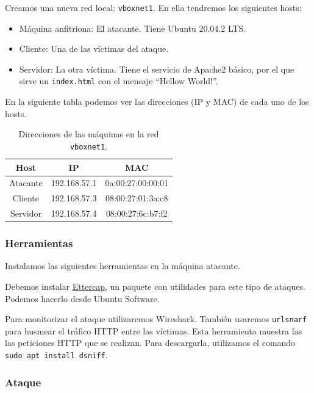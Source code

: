 \documentclass[11pt]{article}
\begin{document}
Creamos una nueva red local: \texttt{vboxnet1}. En ella tendremos los siguientes hosts:
\begin{itemize}
	\item Máquina anfitriona: El atacante. Tiene Ubuntu 20.04.2 LTS.
	\item Cliente: Una de las víctimas del ataque.
	\item Servidor: La otra víctima. Tiene el servicio de Apache2 básico, por el que sirve un \texttt{index.html} con el mensaje
	``Hellow World!''.
\end{itemize}

En la siguiente tabla podemos ver las direcciones (IP y MAC) de cada uno de los hosts.

\begin{table}[H]
	\centering
	\begin{tabular}{|c|c|c|}
		\hline
		\textbf{Host} & \textbf{IP}  & \textbf{MAC}      \\ \hline
		Atacante      & 192.168.57.1 & 0a:00:27:00:00:01 \\ \hline
		Cliente       & 192.168.57.3 & 08:00:27:01:3a:c8 \\ \hline
		Servidor      & 192.168.57.4 & 08:00:27:6c:b7:f2 \\ \hline
	\end{tabular}
	\caption{Direcciones de las máquinas en la red \texttt{vboxnet1}.}
	\label{tab:info-hosts}
\end{table}

\subsubsection*{Herramientas}

Instalamos las siguientes herramientas en la máquina atacante.

Debemos instalar \href{https://www.ettercap-project.org}{Ettercap}, un paquete con utilidades para este tipo de ataques.
Podemos hacerlo desde Ubuntu Software.

Para monitorizar el ataque utilizaremos Wireshark. También usaremos \texttt{urlsnarf} para husmear el tráfico HTTP entre las víctimas. Esta
herramienta muestra las las peticiones HTTP que se realizan. Para descargarla, utilizamos el comando \verb^sudo apt install dsniff^.

\subsubsection*{Ataque}
\end{document}
